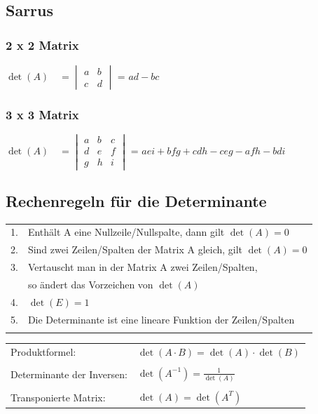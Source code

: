 		    \subsection{Sarrus}
		    \subsubsection{2 x 2 Matrix}
		    $\det(A) \quad= 	\begin{vmatrix}
		    				a & b \\
		    				c & d
		    				\end{vmatrix}$ =  $ad - bc$ \\
		    	
		    	\subsubsection{3 x 3 Matrix}
		    $\det(A) \quad= 	\begin{vmatrix}
		    					a & b &c \\
		    					d & e & f\\
		    					g & h & i
		    				\end{vmatrix}$ =  $aei + bfg + cdh - ceg - afh - bdi$ \\
		    				
		    				
		    \subsection{Rechenregeln für die Determinante}
			\begin{tabular}{ll}
			1. & Enthält A eine Nullzeile/Nullspalte, dann gilt $\det(A) = 0$ \\
		    2. & Sind zwei Zeilen/Spalten der Matrix A gleich, gilt $\det(A) = 0$ \\
		    3. &  Vertauscht man in der Matrix A zwei Zeilen/Spalten, \\
		    &  so ändert das Vorzeichen von $\det(A)$ \\
		    4. & $\det(E) = 1$ \\
		    5. & Die Determinante ist eine lineare Funktion der Zeilen/Spalten \\
		    \\
			\end{tabular}
		    
		    \begin{tabular}{ll}
		    Produktformel: &$\det(A \cdot B) = \det(A) \cdot \det(B)$ \\
		    \\
		    Determinante der Inversen: & $\det(A^{-1}) = \frac{1}{\det(A)}$ \\
		    \\
		    Transponierte Matrix: & $\det(A) = \det(A^T)$ \\
		    \end{tabular}
		    
